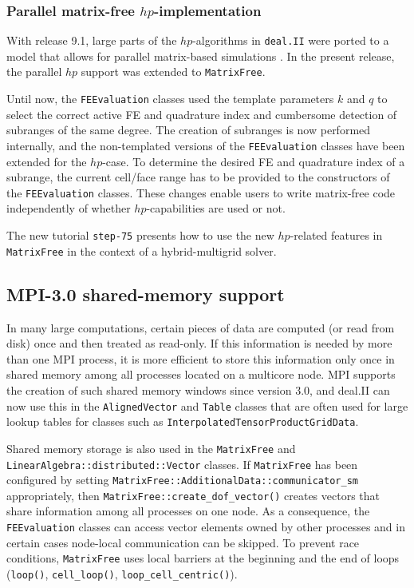 \documentclass{ansarticle-preprint}
\newcommand{\specialword}[1]{\texttt{#1}}
\newcommand{\dealii}{{\specialword{deal.II}}\xspace}
\begin{document}
\subsubsection{Parallel matrix-free $hp$-implementation}\label{subsubsection:mf:hp}

With release 9.1, large parts of the $hp$-algorithms
in \dealii were ported to a model that allows for
parallel matrix-based simulations \cite{dealII91}. In the present
release, the parallel $hp$ support was extended to \texttt{MatrixFree}.

Until now, the \texttt{FEEvaluation} classes used the template
parameters $k$ and $q$ to select the correct active FE and quadrature
index and cumbersome detection of subranges of the same degree.
The creation of subranges is now performed internally, and the non-templated versions
of the \texttt{FEEvaluation} classes have been extended for the $hp$-case. To determine
the desired FE and quadrature index of a subrange, the current cell/face range has to be provided
to the constructors of the \texttt{FEEvaluation} classes. These changes enable
users to write matrix-free code independently of whether $hp$-capabilities are used or not.

The new tutorial \texttt{step-75} presents how to use the new $hp$-related features in \texttt{MatrixFree}
in the context of a hybrid-multigrid solver.



\subsection{MPI-3.0 shared-memory support}\label{subsec:sm}
In many large computations, certain pieces of data are computed
(or read from disk) once and then treated as read-only. If this information is needed by more
than one MPI process, it is more efficient to store this information only
once in shared memory among all processes located on a multicore
node. MPI supports the creation of such shared memory windows since
version 3.0, and deal.II can now use this in the
\texttt{AlignedVector} and \texttt{Table} classes that are often used
for large lookup tables for classes such as \texttt{InterpolatedTensorProductGridData}.

Shared memory storage is also used in the \texttt{MatrixFree} and
\texttt{LinearAlgebra::\allowbreak distributed::\allowbreak Vector} classes. If \texttt{MatrixFree} has been configured by setting
\texttt{MatrixFree::\allowbreak AdditionalData::\allowbreak communicator\_sm} appropriately, then
\texttt{MatrixFree::create\_dof\_vector()} creates vectors that share
information among all processes on one node. As a consequence, the
\texttt{FEEvaluation} classes can access vector elements owned by
other processes and in certain cases node-local
communication can be skipped. To prevent race conditions, \texttt{MatrixFree} uses local
barriers at the beginning and the end of loops (\texttt{loop()}, \texttt{cell\_loop()}, \texttt{loop\_cell\_centric()}).
\end{document}
